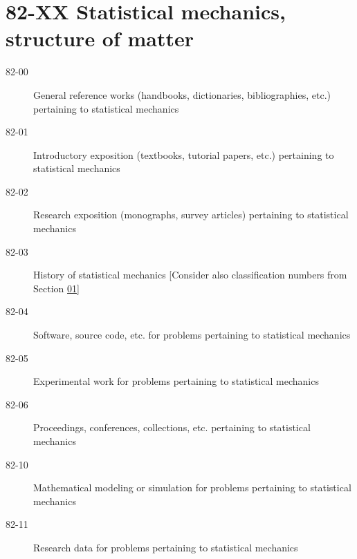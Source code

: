 \section*{82-XX Statistical mechanics, structure of matter }\label{82-XX}
\begin{description}
\item [82-00]\label{82-00} General reference works (handbooks, dictionaries, bibliographies, etc.) pertaining to statistical mechanics
\item [82-01]\label{82-01} Introductory exposition (textbooks, tutorial papers, etc.) pertaining to statistical mechanics
\item [82-02]\label{82-02} Research exposition (monographs, survey articles) pertaining to statistical mechanics
\item [82-03]\label{82-03} History of statistical mechanics [Consider also classification numbers from Section \hyperref[01-XX]{01}]
\item [82-04]\label{82-04} Software, source code, etc. for problems pertaining to statistical mechanics
\item [82-05]\label{82-05} Experimental work for problems pertaining to statistical mechanics
\item [82-06]\label{82-06} Proceedings, conferences, collections, etc. pertaining to statistical mechanics
\item [82-10]\label{82-10} Mathematical modeling or simulation for problems pertaining to statistical mechanics
\item [82-11]\label{82-11} Research data for problems pertaining to statistical mechanics
\end{description}
